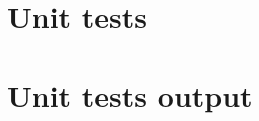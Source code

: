 \section{Unit tests}

\begin{scriptsize}
\begin{ttfamily}

\end{ttfamily}
\end{scriptsize}

\section{Unit tests output}

\begin{scriptsize}
\begin{ttfamily}

\end{ttfamily}
\end{scriptsize}

